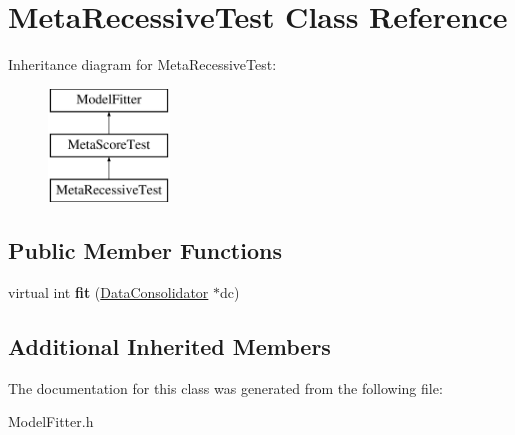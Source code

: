 \hypertarget{classMetaRecessiveTest}{\section{Meta\-Recessive\-Test Class Reference}
\label{classMetaRecessiveTest}
}
Inheritance diagram for Meta\-Recessive\-Test\-:\begin{figure}[H]
\begin{center}
\leavevmode
\includegraphics[height=3.000000cm]{classMetaRecessiveTest}
\end{center}
\end{figure}
\subsection*{Public Member Functions}
\begin{DoxyCompactItemize}
\item 
\hypertarget{classMetaRecessiveTest_a6327391bd4f2e2a0a3bf6367a6cbde78}{virtual int {\bfseries fit} (\hyperlink{classDataConsolidator}{Data\-Consolidator} $\ast$dc)}\label{classMetaRecessiveTest_a6327391bd4f2e2a0a3bf6367a6cbde78}

\end{DoxyCompactItemize}
\subsection*{Additional Inherited Members}


The documentation for this class was generated from the following file\-:\begin{DoxyCompactItemize}
\item 
Model\-Fitter.\-h\end{DoxyCompactItemize}
